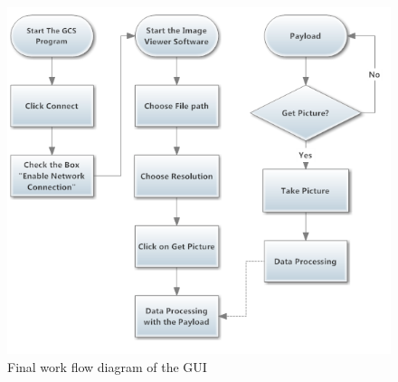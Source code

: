 \begin{figure}[H]
\begin{center}
\includegraphics[scale=1]{figures/finalWorkFlow.PNG} 
\end{center}
\caption{Final work flow diagram of the GUI\label{GUI_finalWorkFlow}}
\end{figure}
